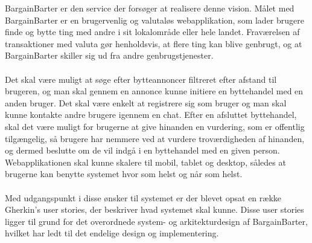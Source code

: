 \noindent BargainBarter er den service der forsøger at realisere denne vision. 
Målet med BargainBarter er en brugervenlig og valutaløs webapplikation, som lader brugere finde og bytte ting med andre i sit lokalområde eller hele landet. Fraværelsen af transaktioner med valuta gør henholdsvis, at flere ting kan blive genbrugt, og at BargainBarter skiller sig ud fra andre genbrugstjenester. \\ \\ \noindent
  Det skal være muligt at søge efter bytteannoncer filtreret efter afstand til brugeren, og man skal gennem en annonce kunne initiere en byttehandel med en anden bruger. Det skal være enkelt at registrere sig som bruger og man skal kunne kontakte andre brugere igennem en chat. Efter en afsluttet byttehandel, skal det være muligt for brugerne at give hinanden en vurdering, som er offentlig tilgængelig, så brugere har nemmere ved at vurdere troværdigheden af hinanden, og dermed beslutte om de vil indgå i en byttehandel med en given person. Webapplikationen skal kunne skalere til mobil, tablet og desktop, således at brugerne kan benytte systemet hvor som helst og når som helst.  \\ \\ \noindent
Med udgangspunkt i disse ønsker til systemet er der blevet opsat en række Gherkin's user stories, der beskriver hvad systemet skal kunne. Disse user stories ligger til grund for det overordnede system- og arkitekturdesign af BargainBarter, hvilket har ledt til det endelige design og implementering.  


